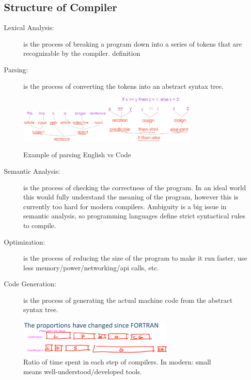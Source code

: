 \documentclass[a4paper, 10pt]{article}
\begin{document}
\subsection{Structure of Compiler}
\begin{description}
	\item[Lexical Analysis:] is the process of breaking a program down into a series of tokens that are recognizable by the compiler.
	      definition
\end{description}
\begin{description}
	\item[Parsing:]
	      is the process of converting the tokens into an abstract syntax tree.
\end{description}
\begin{figure}[ht]
	\centering
	\includegraphics[width=0.4\textwidth]{intro.parsingEnglish.png}
	\includegraphics[width=0.4\textwidth]{intro.parsingCode.png}
	\caption{Example of parsing English vs Code}
\end{figure}
\begin{description}
	\item[Semantic Analysis:] is the process of checking the correctness of the program. In an ideal world this would fully understand the meaning of the program, however this is currently too hard for modern compilers. Ambiguity is a big issue in semantic analysis, so programming languages define strict syntactical rules to compile.
\end{description}
\begin{description}
	\item[Optimization:] is the process of reducing the size of the program to make it run faster, use less memory/power/networking/api calls, etc.
\end{description}
\begin{description}
	\item[Code Generation:] is the process of generating the actual machine code from the abstract syntax tree.
\end{description}
\begin{figure}[ht]
	\centering
	\includegraphics[width=0.7\textwidth]{intro.compilerRatio.png}
	\caption{Ratio of time spent in each step of compilers. In modern: small means well-understood/developed tools.}
\end{figure}
\end{document}
